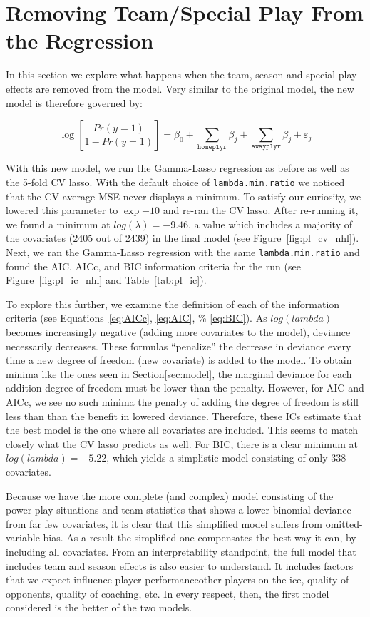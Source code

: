 \documentclass[11pt, fleqn]{article}
\begin{document}
\section{Removing Team/Special Play From the Regression}

In this section we explore what happens when the team, season and special play effects are removed from the model.  Very similar to the original model, the new model is therefore governed by:

\[ \log\left[\frac{Pr(y=1)}{1-Pr(y=1)}\right] = \beta_0 + \sum_{\texttt{homeplyr}} \beta_j + \sum_{\texttt{awayplyr}} \beta_j + \varepsilon_j \]

With this new model, we run the Gamma-Lasso regression as before as well as the 5-fold CV lasso.  With the default choice of \texttt{lambda.min.ratio} we noticed that the CV average MSE never displays a minimum.  To satisfy our curiosity, we lowered this parameter to $\exp{-10}$ and re-ran the CV lasso.  After re-running it, we found a minimum at $log(\lambda)=-9.46$, a value which includes a majority of the covariates (2405 out of 2439) in the final model (see Figure~\vref{fig:pl_cv_nhl}).  Next, we ran the Gamma-Lasso regression with the same \texttt{lambda.min.ratio} and found the AIC, AICc, and BIC information criteria for the run (see Figure~\vref{fig:pl_ic_nhl} and Table~\vref{tab:pl_ic}).

To explore this further, we examine the definition of each of the information criteria (see Equations~\eqref{eq:AICc}, \eqref{eq:AIC}, \% \eqref{eq:BIC}).  As $log(lambda)$ becomes increasingly negative (adding more covariates to the model), deviance necessarily decreases.  These formulas ``penalize'' the decrease in deviance every time a new degree of freedom (new covariate) is added to the model.  To obtain minima like the ones seen in Section\ref{sec:model}, the marginal deviance for each addition degree-of-freedom must be lower than the penalty.  However, for AIC and AICc, we see no such minima \textemdash the penalty of adding the degree of freedom is still less than than the benefit in lowered deviance.  Therefore, these ICs estimate that the best model is the one where all covariates are included.  This seems to match closely what the CV lasso predicts as well.  For BIC, there is a clear minimum at $log(lambda)=-5.22$, which yields a simplistic model consisting of only 338 covariates.



Because we have the more complete (and complex) model consisting of the power-play situations and team statistics that shows a lower binomial deviance from far few covariates, it is clear that this simplified model suffers from omitted-variable bias.  As a result the simplified one compensates the best way it can, by including all covariates. From an interpretability standpoint, the full model that includes team and season effects is also easier to understand. It includes factors that we expect influence player performance\textemdash other players on the ice, quality of opponents, quality of coaching, etc. In every respect, then, the first model considered is the better of the two models.
\end{document}
